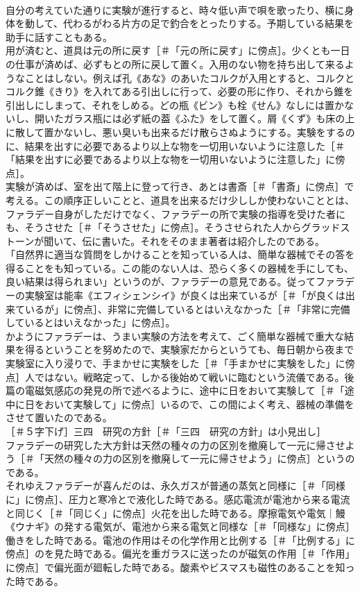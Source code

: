 \documentclass[8pt]{extreport}
\begin{document}
\begin{CJK}{UTF8}{min}
\\	自分の考えていた通りに実験が進行すると、時々低い声で唄を歌ったり、横に身体を動して、代わるがわる片方の足で釣合をとったりする。予期している結果を助手に話すこともある。
\\	用が済むと、道具は元の所に戻す［＃「元の所に戻す」に傍点］。少くとも一日の仕事が済めば、必ずもとの所に戻して置く。入用のない物を持ち出して来るようなことはしない。例えば孔《あな》のあいたコルクが入用とすると、コルクとコルク錐《きり》を入れてある引出しに行って、必要の形に作り、それから錐を引出しにしまって、それをしめる。どの瓶《ビン》も栓《せん》なしには置かないし、開いたガラス瓶には必ず紙の葢《ふた》をして置く。屑《くず》も床の上に散して置かないし、悪い臭いも出来るだけ散らさぬようにする。実験をするのに、結果を出すに必要であるより以上な物を一切用いないように注意した［＃「結果を出すに必要であるより以上な物を一切用いないように注意した」に傍点］。
\\	実験が済めば、室を出て階上に登って行き、あとは書斎［＃「書斎」に傍点］で考える。この順序正しいことと、道具を出来るだけ少ししか使わないこととは、ファラデー自身がしただけでなく、ファラデーの所で実験の指導を受けた者にも、そうさせた［＃「そうさせた」に傍点］。そうさせられた人からグラッドストーンが聞いて、伝に書いた。それをそのまま著者は紹介したのである。
\\	「自然界に適当な質問をしかけることを知っている人は、簡単な器械でその答を得ることをも知っている。この能のない人は、恐らく多くの器械を手にしても、良い結果は得られまい」というのが、ファラデーの意見である。従ってファラデーの実験室は能率《エフィシェンシイ》が良くは出来ているが［＃「が良くは出来ているが」に傍点］、非常に完備しているとはいえなかった［＃「非常に完備しているとはいえなかった」に傍点］。
\\	かようにファラデーは、うまい実験の方法を考えて、ごく簡単な器械で重大な結果を得るということを努めたので、実験家だからというても、毎日朝から夜まで実験室に入り浸りで、手まかせに実験をした［＃「手まかせに実験をした」に傍点］人ではない。戦略定って、しかる後始めて戦いに臨むという流儀である。後篇の電磁気感応の発見の所で述べるように、途中に日をおいて実験して［＃「途中に日をおいて実験して」に傍点］いるので、この間によく考え、器械の準備をさせて置いたのである。
\\	［＃５字下げ］三四　研究の方針［＃「三四　研究の方針」は小見出し］
\\	ファラデーの研究した大方針は天然の種々の力の区別を撤廃して一元に帰させよう［＃「天然の種々の力の区別を撤廃して一元に帰させよう」に傍点］というのである。
\\	それゆえファラデーが喜んだのは、永久ガスが普通の蒸気と同様に［＃「同様に」に傍点］、圧力と寒冷とで液化した時である。感応電流が電池から来る電流と同じく［＃「同じく」に傍点］火花を出した時である。摩擦電気や電気｜鰻《ウナギ》の発する電気が、電池から来る電気と同様な［＃「同様な」に傍点］働きをした時である。電池の作用はその化学作用と比例する［＃「比例する」に傍点］のを見た時である。偏光を重ガラスに送ったのが磁気の作用［＃「作用」に傍点］で偏光面が廻転した時である。酸素やビスマスも磁性のあることを知った時である。

\end{CJK}
\end{document}
